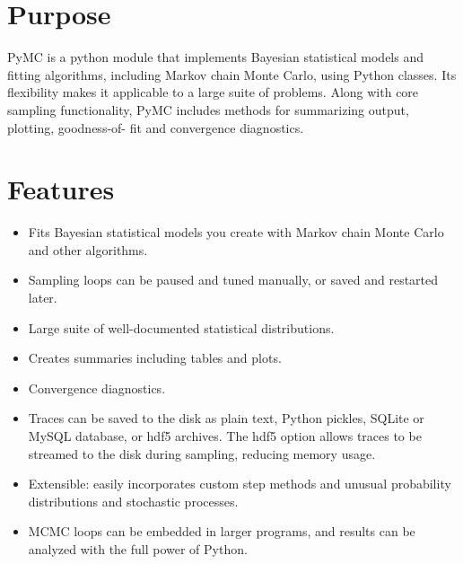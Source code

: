 





\hypertarget{purpose}{}
\section*{Purpose}

PyMC is a python module that implements Bayesian statistical models and
fitting algorithms, including Markov chain Monte Carlo, using Python classes. 
Its flexibility makes it applicable to a large suite of problems. Along with 
core sampling functionality, PyMC includes methods for summarizing output, plotting, 
goodness-of- fit and convergence diagnostics.



\hypertarget{features}{}
\section*{Features}
\begin{itemize}
\item {} 
Fits Bayesian statistical models you create with Markov chain Monte Carlo and 
other algorithms.

\item {} 
Sampling loops can be paused and tuned manually, or saved and restarted later.

\item {} 
Large suite of well-documented statistical distributions.

\item {} 
Creates summaries including tables and plots.

\item {} 
Convergence diagnostics.

\item {} 
Traces can be saved to the disk as plain text, Python pickles, SQLite or MySQL
database, or hdf5 archives. The hdf5 option allows traces to be streamed
to the disk during sampling, reducing memory usage.

\item {} 
Extensible: easily incorporates custom step methods and unusual probability 
distributions and stochastic processes.

\item {} 
MCMC loops can be embedded in larger programs, and results can be analyzed 
with the full power of Python.

\end{itemize}


